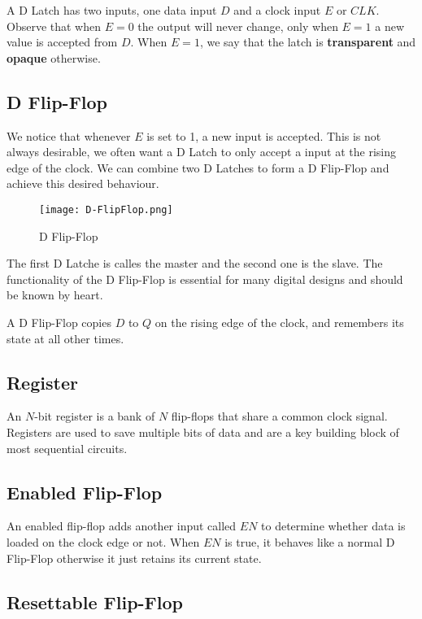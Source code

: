 A D Latch has two inputs, one data input $D$ and a clock input $E$ or $CLK$. Observe that when $E = 0$
the output will never change, only when $E = 1$ a new value is accepted from $D$. When $E = 1$, we
say that the latch is \textbf{transparent} and \textbf{opaque} otherwise.

\subsection{D Flip-Flop}

We notice that whenever $E$ is set to 1, a new input is accepted. This is not always desirable, we
often want a D Latch to only accept a input at the rising edge of the clock. We can combine two
D Latches to form a D Flip-Flop and achieve this desired behaviour.

\begin{figure}[h]
    \centering
    \texttt{[image: D-FlipFlop.png]}
    \caption{D Flip-Flop}
\end{figure}

The first D Latche is calles the master and the second one is the slave. The functionality of the 
D Flip-Flop is essential for many digital designs and should be known by heart.

\begin{satz}
    A D Flip-Flop copies $D$ to $Q$ on the rising edge of the clock, and remembers its state at all
    other times.
\end{satz}

\subsection{Register}

An $N$-bit register is a bank of $N$ flip-flops that share a common clock signal. Registers are used
to save multiple bits of data and are a key building block of most sequential circuits.

\subsection{Enabled Flip-Flop}

An enabled flip-flop adds another input called $EN$ to determine whether data is loaded on the clock
edge or not. When $EN$ is true, it behaves like a normal D Flip-Flop otherwise it just retains its
current state.

\subsection{Resettable Flip-Flop}

